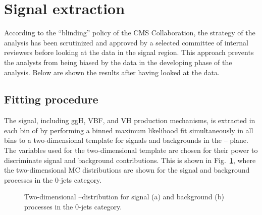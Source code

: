 \section{Signal extraction}
\label{sec:SignalExtraction}

According to the ``blinding'' policy of the CMS Collaboration, the strategy of the analysis has been scrutinized and approved by a selected committee of internal reviewers before looking at the data in the signal region. This approach prevents the analysts from being biased by the data in the developing phase of the analysis. Below are shown the results after having looked at the data.


\subsection{Fitting procedure}\label{sec:fit}

The signal, including ggH, VBF, and VH production mechanisms, is extracted in each bin of \pth{} by performing a binned maximum likelihood fit simultaneously in all \pth{} bins to a two-dimensional template for signals and backgrounds in the \mll--\mt{} plane.
The variables used for the two-dimensional template are chosen for their power to discriminate signal and background contributions. This is shown in Fig.~\ref{fig:2Dlegacy}, where the two-dimensional MC distributions are shown for the signal and background processes in the 0-jets category. 

\begin{figure}[htb]
\centering
{}
\caption{Two-dimensional \mll--\mt distribution for signal (a) and background (b) processes in the 0-jets category.\label{fig:2Dlegacy}}
\end{figure}

